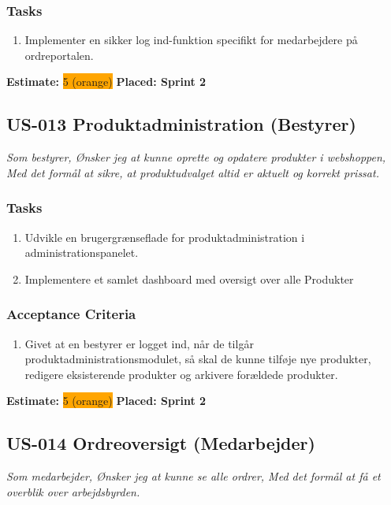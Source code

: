 \subsubsection*{\textbf{Tasks}}
\begin{enumerate}
  \item Implementer en sikker log ind-funktion specifikt for medarbejdere på ordreportalen.
\end{enumerate}
\textbf{Estimate:} \colorbox{orange}{5 (orange)}
\textbf{Placed: Sprint 2}
\par\noindent\dotfill

\subsection{US-013 Produktadministration (Bestyrer)}
\label{sec:US-013}
\textit{Som bestyrer, Ønsker jeg at kunne oprette og opdatere produkter i webshoppen, Med det formål at sikre, at produktudvalget altid er aktuelt og korrekt prissat.}
\subsubsection*{\textbf{Tasks}}
\begin{enumerate}
  \item Udvikle en brugergrænseflade for produktadministration i administrationspanelet.
  \item Implementere et samlet dashboard med oversigt over alle Produkter
\end{enumerate}
\subsubsection*{\textbf{Acceptance Criteria}}
\begin{enumerate}
  \item Givet at en bestyrer er logget ind, når de tilgår produktadministrationsmodulet, så skal de kunne tilføje nye produkter, redigere eksisterende produkter og arkivere forældede produkter.
\end{enumerate}
\textbf{Estimate:} \colorbox{orange}{5 (orange)}
\textbf{Placed: Sprint 2}
\par\noindent\dotfill

\subsection{US-014 Ordreoversigt (Medarbejder)}
\label{sec:US-014}
\textit{Som medarbejder, Ønsker jeg at kunne se alle ordrer, Med det formål at få et overblik over arbejdsbyrden.}
